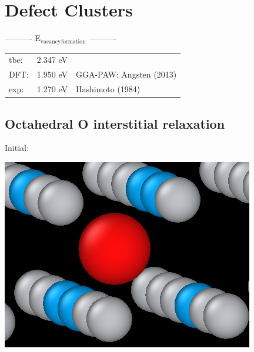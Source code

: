 \documentclass[11pt]{article}
\begin{document}
\section{Defect Clusters}
\label{sec:orgf883da5}

----------     E\(_{\text{vacancy}}\)\(_{\text{formation}}\)     ----------

\begin{center}
\begin{tabular}{lll}
tbe: & 2.347  eV & \\
DFT: & 1.950  eV & GGA-PAW:   Angsten  (2013)\\
exp: & 1.270  eV & Hashimoto  (1984)\\
\end{tabular}
\end{center}

\subsection{Octahedral O interstitial relaxation}
\label{sec:org1ba4055}

Initial:
\begin{center}
\includegraphics[width=.9\linewidth]{Images/initial_octahedral_ox_ovito.png}
\end{center}
\end{document}
